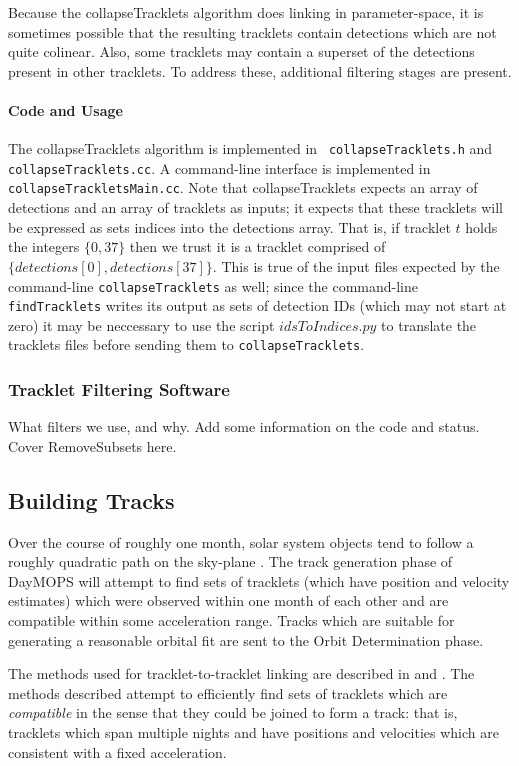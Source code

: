 Because the collapseTracklets algorithm does linking in
parameter-space, it is sometimes possible that the resulting tracklets
contain detections which are not quite colinear.  Also, some tracklets
may contain a superset of the detections present in other tracklets.  To address these, additional filtering stages are present.

\paragraph{Code and Usage}
The collapseTracklets algorithm is implemented in {\tt
  collapseTracklets.h} and {\tt collapseTracklets.cc}.  A command-line
interface is implemented in {\tt collapseTrackletsMain.cc}.  Note that
collapseTracklets expects an array of detections and an array of
tracklets as inputs; it expects that these tracklets will be expressed
as sets indices into the detections array.  That is, if tracklet $t$
holds the integers $\{0, 37\}$ then we trust it is a tracklet
comprised of $\{detections[0], detections[37]\}$.  This is true of the
input files expected by the command-line {\tt collapseTracklets} as
well; since the command-line {\tt findTracklets} writes its output as
sets of detection IDs (which may not start at zero) it may be
neccessary to use the script $idsToIndices.py$ to translate the
tracklets files before sending them to {\tt collapseTracklets}.



\subsubsection{Tracklet Filtering Software}
What filters we use, and why. Add some information on the code and
status.  Cover RemoveSubsets here.


\subsection{Building Tracks}

Over the course of roughly one month, solar system objects tend to
follow a roughly quadratic path on the sky-plane
\citep{kubica_thesis}.  The track generation phase of DayMOPS will
attempt to find sets of tracklets (which have position and velocity
estimates) which were observed within one month of each other and are
compatible within some acceleration range.  Tracks which are
suitable for generating a reasonable orbital fit are sent to the Orbit
Determination phase.

The methods used for tracklet-to-tracklet linking are described in
\citet{kubica_thesis} and \citet{Kubica:2005:MTA:1081870.1081889}.
The methods described attempt to efficiently find sets of tracklets
which are \textit{compatible} in the sense that they could be joined
to form a track: that is, tracklets which span multiple nights and
have positions and velocities which are consistent with a fixed
acceleration.  

